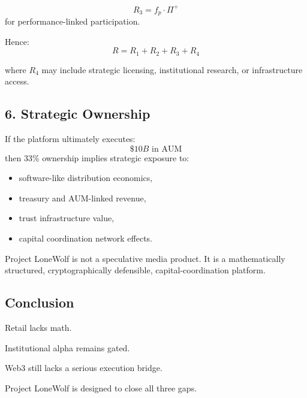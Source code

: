 \documentclass[11pt]{article}
\begin{document}
\[
R_3 = f_p \cdot \Pi^+
\]
for performance-linked participation.

Hence:
\[
R = R_1 + R_2 + R_3 + R_4
\]

where \(R_4\) may include strategic licensing, institutional research, or infrastructure access.

\subsection*{6. Strategic Ownership}

If the platform ultimately executes:
\[
\$10B \text{ in AUM}
\]
then 33\% ownership implies strategic exposure to:
\begin{itemize}[leftmargin=1.5em]
  \item software-like distribution economics,
  \item treasury and AUM-linked revenue,
  \item trust infrastructure value,
  \item capital coordination network effects.
\end{itemize}

\begin{thesisbox}
Project LoneWolf is not a speculative media product. It is a mathematically structured, cryptographically defensible, capital-coordination platform.
\end{thesisbox}

\subsection*{Conclusion}

Retail lacks math.

Institutional alpha remains gated.

Web3 still lacks a serious execution bridge.

Project LoneWolf is designed to close all three gaps.
\end{document}
